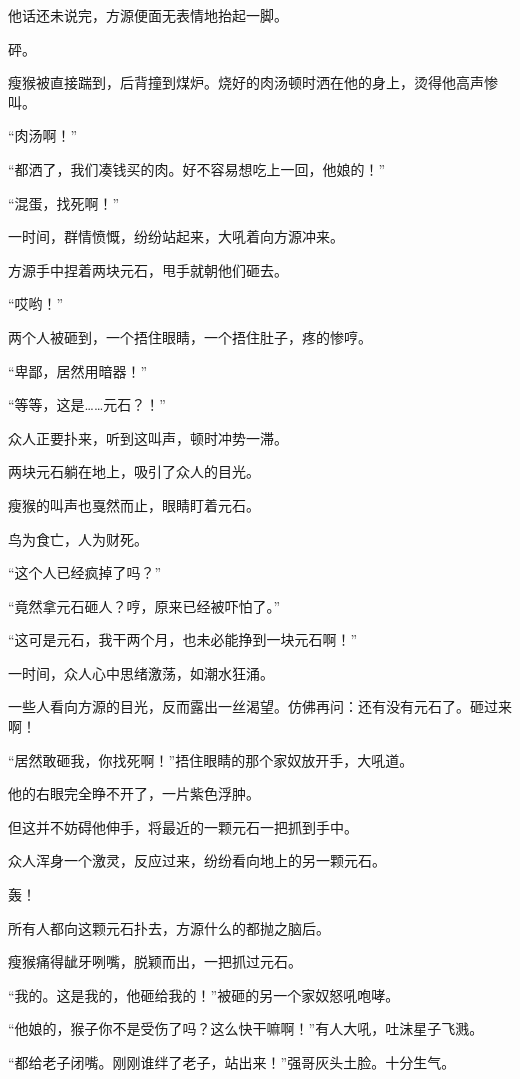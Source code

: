 \begin{this_body}
他话还未说完，方源便面无表情地抬起一脚。

砰。

瘦猴被直接踹到，后背撞到煤炉。烧好的肉汤顿时洒在他的身上，烫得他高声惨叫。

“肉汤啊！”

“都洒了，我们凑钱买的肉。好不容易想吃上一回，他娘的！”

“混蛋，找死啊！”

一时间，群情愤慨，纷纷站起来，大吼着向方源冲来。

方源手中捏着两块元石，甩手就朝他们砸去。

“哎哟！”

两个人被砸到，一个捂住眼睛，一个捂住肚子，疼的惨哼。

“卑鄙，居然用暗器！”

“等等，这是……元石？！”

众人正要扑来，听到这叫声，顿时冲势一滞。

两块元石躺在地上，吸引了众人的目光。

瘦猴的叫声也戛然而止，眼睛盯着元石。

鸟为食亡，人为财死。

“这个人已经疯掉了吗？”

“竟然拿元石砸人？哼，原来已经被吓怕了。”

“这可是元石，我干两个月，也未必能挣到一块元石啊！”

一时间，众人心中思绪激荡，如潮水狂涌。

一些人看向方源的目光，反而露出一丝渴望。仿佛再问：还有没有元石了。砸过来啊！

“居然敢砸我，你找死啊！”捂住眼睛的那个家奴放开手，大吼道。

他的右眼完全睁不开了，一片紫色浮肿。

但这并不妨碍他伸手，将最近的一颗元石一把抓到手中。

众人浑身一个激灵，反应过来，纷纷看向地上的另一颗元石。

轰！

所有人都向这颗元石扑去，方源什么的都抛之脑后。

瘦猴痛得龇牙咧嘴，脱颖而出，一把抓过元石。

“我的。这是我的，他砸给我的！”被砸的另一个家奴怒吼咆哮。

“他娘的，猴子你不是受伤了吗？这么快干嘛啊！”有人大吼，吐沫星子飞溅。

“都给老子闭嘴。刚刚谁绊了老子，站出来！”强哥灰头土脸。十分生气。


\end{this_body}
